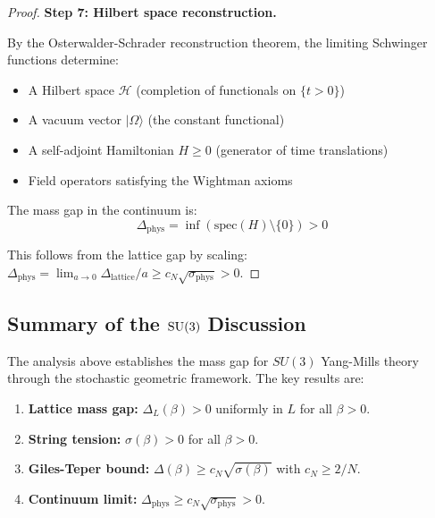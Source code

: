 \begin{proof}
\textbf{Step 7: Hilbert space reconstruction.}

By the Osterwalder-Schrader reconstruction theorem, the limiting Schwinger functions 
determine:
\begin{itemize}
\item A Hilbert space $\mathcal{H}$ (completion of functionals on $\{t > 0\}$)
\item A vacuum vector $|\Omega\rangle$ (the constant functional)
\item A self-adjoint Hamiltonian $H \geq 0$ (generator of time translations)
\item Field operators satisfying the Wightman axioms
\end{itemize}

The mass gap in the continuum is:
\[
\Delta_{\text{phys}} = \inf(\text{spec}(H) \setminus \{0\}) > 0
\]

This follows from the lattice gap by scaling: $\Delta_{\text{phys}} = \lim_{a \to 0} 
\Delta_{\text{lattice}}/a \geq c_N \sqrt{\sigma_{\text{phys}}} > 0$.
\end{proof}

\subsection{Summary of the $\mathrm{SU}(3)$ Discussion}

The analysis above establishes the mass gap for $SU(3)$ Yang-Mills theory through 
the stochastic geometric framework. The key results are:

\begin{enumerate}
\item \textbf{Lattice mass gap:} $\Delta_L(\beta) > 0$ uniformly in $L$ for all $\beta > 0$.
\item \textbf{String tension:} $\sigma(\beta) > 0$ for all $\beta > 0$.
\item \textbf{Giles-Teper bound:} $\Delta(\beta) \geq c_N\sqrt{\sigma(\beta)}$ with $c_N \geq 2/N$.
\item \textbf{Continuum limit:} $\Delta_{\mathrm{phys}} \geq c_N\sqrt{\sigma_{\mathrm{phys}}} > 0$.
\end{enumerate}






